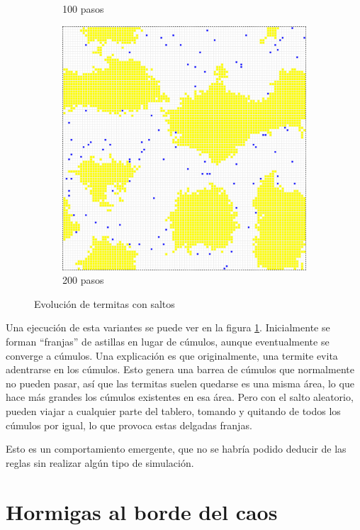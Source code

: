 \documentclass{article}
\begin{document}
\begin{figure}
\begin{subfigure}{0.3\textwidth}
    \caption{100 pasos}
  \end{subfigure}
  \begin{subfigure}{0.3\textwidth}
    \includegraphics[width=\textwidth]{imgs/termites-teleport5.png}
    \caption{200 pasos}
  \end{subfigure}
  \caption{Evolución de termitas con saltos}
  \label{fig:termite-teleport}
\end{figure}

Una ejecución de esta variantes se puede ver en la figura
\ref{fig:termite-teleport}. Inicialmente se forman ``franjas'' de astillas en
lugar de cúmulos, aunque eventualmente se converge a cúmulos. Una explicación es
que originalmente, una termite evita adentrarse en los cúmulos. Esto genera una
barrea de cúmulos que normalmente no pueden pasar, así que las termitas suelen
quedarse es una misma área, lo que hace más grandes los cúmulos existentes en
esa área. Pero con el salto aleatorio, pueden viajar a cualquier parte del
tablero, tomando y quitando de todos los cúmulos por igual, lo que provoca estas
delgadas franjas.

Esto es un comportamiento emergente, que no se habría podido deducir de las
reglas sin realizar algún tipo de simulación.

\section{Hormigas al borde del caos}
\end{document}
